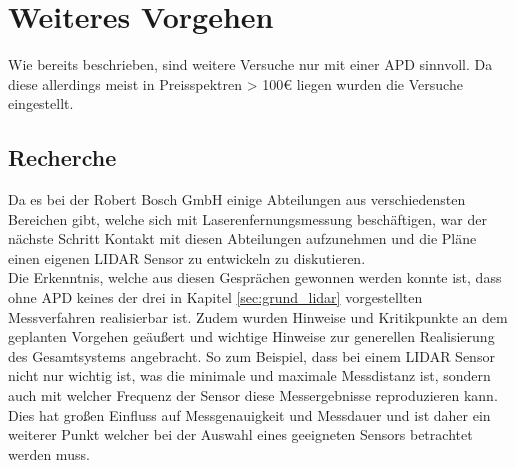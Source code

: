 \section{Weiteres Vorgehen}
Wie bereits beschrieben, sind weitere Versuche nur mit einer \ac{APD} sinnvoll. Da diese allerdings meist in Preisspektren > 100€ liegen wurden die Versuche eingestellt.
\subsection{Recherche}
Da es bei der Robert Bosch GmbH einige Abteilungen aus verschiedensten Bereichen gibt, welche sich mit Laserenfernungsmessung beschäftigen, war der nächste Schritt Kontakt mit diesen Abteilungen aufzunehmen und die Pläne einen eigenen \ac{LIDAR} Sensor zu entwickeln zu diskutieren. \\ 
Die Erkenntnis, welche aus diesen Gesprächen gewonnen werden konnte ist, dass ohne \ac{APD} keines der drei in Kapitel \ref{sec:grund_lidar}  vorgestellten Messverfahren realisierbar ist. Zudem wurden Hinweise und Kritikpunkte an dem geplanten Vorgehen geäußert und wichtige Hinweise zur generellen Realisierung des Gesamtsystems angebracht. So zum Beispiel, dass bei einem \ac{LIDAR} Sensor nicht nur wichtig ist, was die minimale und maximale Messdistanz ist, sondern auch mit welcher Frequenz der Sensor diese Messergebnisse reproduzieren kann. Dies hat großen Einfluss auf Messgenauigkeit und Messdauer und ist daher ein weiterer Punkt welcher bei der Auswahl eines geeigneten Sensors betrachtet werden muss.
